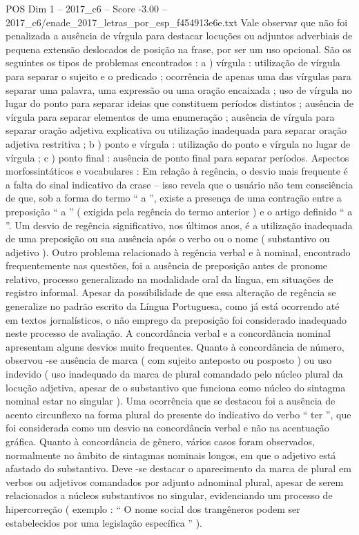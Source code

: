 \begin{textsample}{POS Dim 1 – 2017\_c6 – Score -3.00 – 2017\_c6/enade\_2017\_letras\_por\_esp\_f454913e6e.txt}
Vale observar que não foi penalizada a ausência de vírgula para destacar locuções ou adjuntos adverbiais de pequena extensão deslocados de posição na frase, por ser um uso opcional.
São os seguintes os tipos de problemas encontrados : a ) vírgula : utilização de vírgula para separar o sujeito e o predicado ; ocorrência de apenas uma das vírgulas para separar uma palavra, uma expressão ou uma oração encaixada ; uso de vírgula no lugar do ponto para separar ideias que constituem períodos distintos ; ausência de vírgula para separar elementos de uma enumeração ; ausência de vírgula para separar oração adjetiva explicativa ou utilização inadequada para separar oração adjetiva restritiva ; b ) ponto e vírgula : utilização do ponto e vírgula no lugar de vírgula ; c ) ponto final : ausência de ponto final para separar períodos.
Aspectos morfossintáticos e vocabulares : Em relação à regência, o desvio mais frequente é a falta do sinal indicativo da crase – isso revela que o usuário não tem consciência de que, sob a forma do termo “ a ”, existe a presença de uma contração entre a preposição “ a ” ( exigida pela regência do termo anterior ) e o artigo definido “ a ”.
Um desvio de regência significativo, nos últimos anos, é a utilização inadequada de uma preposição ou sua ausência após o verbo ou o nome ( substantivo ou adjetivo ).
Outro problema relacionado à regência verbal e à nominal, encontrado frequentemente nas questões, foi a ausência de preposição antes de pronome relativo, processo generalizado na modalidade oral da língua, em situações de registro informal.
Apesar da possibilidade de que essa alteração de regência se generalize no padrão escrito da Língua Portuguesa, como já está ocorrendo até em textos jornalísticos, o não emprego da preposição foi considerado inadequado neste processo de avaliação.
A concordância verbal e a concordância nominal apresentam alguns desvios muito frequentes.
Quanto à concordância de número, observou -se ausência de marca ( com sujeito anteposto ou posposto ) ou uso indevido ( uso inadequado da marca de plural comandado pelo núcleo plural da locução adjetiva, apesar de o substantivo que funciona como núcleo do sintagma nominal estar no singular ).
Uma ocorrência que se destacou foi a ausência de acento circunflexo na forma plural do presente do indicativo do verbo “ ter ”, que foi considerada como um desvio na concordância verbal e não na acentuação gráfica.
Quanto à concordância de gênero, vários casos foram observados, normalmente no âmbito de sintagmas nominais longos, em que o adjetivo está afastado do substantivo.
Deve -se destacar o aparecimento da marca de plural em verbos ou adjetivos comandados por adjunto adnominal plural, apesar de serem relacionados a núcleos substantivos no singular, evidenciando um processo de hipercorreção ( exemplo : “ O nome social dos trangêneros podem ser estabelecidos por uma legislação específica ” ).

\end{textsample}
